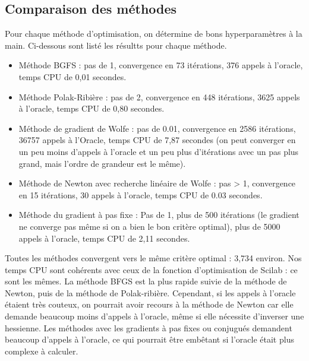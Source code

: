 \documentclass[12pt, letterpaper]{article}
\begin{document}
\subsection*{Comparaison des méthodes}
Pour chaque méthode d'optimisation, on détermine de bons hyperparamètres à la main. Ci-dessous sont listé les résultts pour chaque méthode.
\begin{itemize}
\item Méthode BGFS : pas de 1, convergence en 73 itérations, 376 appels à l'oracle, temps CPU de 0,01 secondes.
\item Méthode Polak-Ribière : pas de 2, convergence en 448 itérations, 3625 appels à l'oracle, temps CPU de 0,80 secondes.
\item Méthode de gradient de Wolfe : pas de 0.01, convergence en 2586 itérations, 36757 appels à l'Oracle, temps CPU de 7,87 secondes (on peut converger en un peu moins d'appels à l'oracle et un peu plus d'itérations avec un pas plus grand, mais l'ordre de grandeur est le même).
\item Méthode de Newton avec recherche linéaire de Wolfe : pas > 1, convergence en 15 itérations, 30 appels à l'oracle, temps CPU de 0.03 secondes.
\item Méthode du gradient à pas fixe : Pas de 1, plus de 500 itérations (le gradient ne converge pas même si on a bien le bon critère optimal), plus de 5000 appels à l'oracle, temps CPU de 2,11 secondes.
\end{itemize}

Toutes les méthodes convergent vers le même critère optimal : 3,734 environ.
Nos temps CPU sont cohérents avec ceux de la fonction d'optimisation de Scilab : ce sont les mêmes. 
La méthode BFGS est la plus rapide suivie de la méthode de Newton, puis de la méthode de Polak-ribière. Cependant, si les appels à l'oracle étaient très couteux, on pourrait avoir recours à la méthode de Newton car elle demande beaucoup moins d'appels à l'oracle, même si elle nécessite d'inverser une hessienne. 
Les méthodes avec les gradients à pas fixes ou conjugués demandent beaucoup d'appels à l'oracle, ce qui pourrait être embêtant si l'oracle était plus complexe à calculer.
\end{document}
